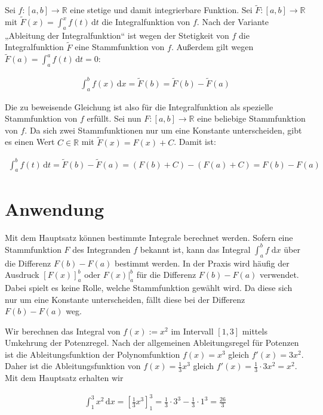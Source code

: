 \documentclass[fontsize=9pt,
               parskip=half-,
               DIV=14,
               listof=chapterentry,
               tocflat]{scrbook}
\renewcommand*{\rm}[1]{\mathrm{#1}}
\begin{document}
\begin{proof*}
Sei $f\colon [a,b]\to \mathbb {R} $ eine stetige und damit integrierbare Funktion. Sei ${\tilde {F}}:[a,b]\to \mathbb {R} $ mit ${\tilde {F}}(x)=\int _{a}^{x}f(t)\,\mathrm {d} t$ die Integralfunktion von $f$. Nach der Variante „Ableitung der Integralfunktion“ ist wegen der Stetigkeit von $f$ die Integralfunktion ${\tilde {F}}$ eine Stammfunktion von $f$. Außerdem gilt wegen ${\tilde {F}}(a)=\int _{a}^{a}f(t)\,\mathrm {d} t=0$:

\begin{align*}
\int _{a}^{b}f(x)\,\mathrm {d} x={\tilde {F}}(b)={\tilde {F}}(b)-{\tilde {F}}(a)
\end{align*}

Die zu beweisende Gleichung ist also für die Integralfunktion als spezielle Stammfunktion von $f$ erfüllt. Sei nun $F:[a,b]\to \mathbb {R} $ eine beliebige Stammfunktion von $f$. Da sich zwei Stammfunktionen nur um eine Konstante unterscheiden, gibt es einen Wert $C\in \mathbb {R} $ mit ${\tilde {F}}(x)=F(x)+C$. Damit ist:

\begin{align*}
\int _{a}^{b}f(t)\,\mathrm {d} t={\tilde {F}}(b)-{\tilde {F}}(a)=(F(b)+C)-(F(a)+C)=F(b)-F(a)
\end{align*}

\end{proof*}

\section{Anwendung}

Mit dem Hauptsatz können bestimmte Integrale berechnet werden. Sofern eine Stammfunktion $F$ des Integranden $f$ bekannt ist, kann das Integral $\int _{a}^{b}f\;{\rm {d}}x$ über die Differenz $F(b)-F(a)$ bestimmt werden. In der Praxis wird häufig der Ausdruck $\left[F(x)\right]_{a}^{b}$ oder $\left.F(x)\right|_{a}^{b}$ für die Differenz $F(b)-F(a)$ verwendet. Dabei spielt es keine Rolle, welche Stammfunktion gewählt wird. Da diese sich nur um eine Konstante unterscheiden, fällt diese bei der Differenz $F(b)-F(a)$ weg.

\begin{example*}
Wir berechnen das Integral von $f(x):=x^{2}$ im Intervall $[1,3]$ mittels Umkehrung der Potenzregel. Nach der allgemeinen Ableitungsregel für Potenzen ist die Ableitungsfunktion der Polynomfunktion $f(x)=x^{3}$ gleich $f'(x)=3x^{2}$. Daher ist die Ableitungsfunktion von $f(x)={\tfrac {1}{3}}x^{3}$ gleich $f'(x)={\tfrac {1}{3}}\cdot 3x^{2}=x^{2}$. Mit dem Hauptsatz erhalten wir

\begin{align*}
\int _{1}^{3}x^{2}\,\mathrm {d} x=\left[{\frac {1}{3}}x^{3}\right]_{1}^{3}={\frac {1}{3}}\cdot 3^{3}-{\frac {1}{3}}\cdot 1^{3}={\frac {26}{3}}
\end{align*}

\end{example*}
\end{document}
